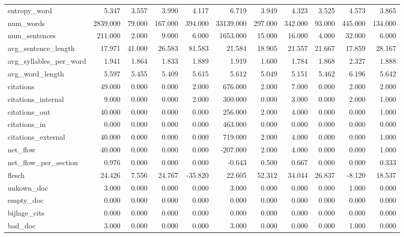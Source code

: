 \begin{tabular}{lrrrrrrrrrr}
\cline{1-11}
entropy\_word & 5.347 & 3.557 & 3.990 & 4.117 & 6.719 & 3.949 & 4.323 & 3.525 & 4.573 & 3.865 \\
\cline{1-11}
num\_words & 2839.000 & 79.000 & 167.000 & 394.000 & 33139.000 & 297.000 & 342.000 & 93.000 & 445.000 & 134.000 \\
\cline{1-11}
num\_sentences & 211.000 & 2.000 & 9.000 & 6.000 & 1653.000 & 15.000 & 16.000 & 4.000 & 32.000 & 6.000 \\
\cline{1-11}
avg\_sentence\_length & 17.971 & 41.000 & 26.583 & 81.583 & 21.584 & 18.905 & 21.557 & 21.667 & 17.859 & 28.167 \\
\cline{1-11}
avg\_syllables\_per\_word & 1.941 & 1.864 & 1.833 & 1.889 & 1.919 & 1.600 & 1.784 & 1.868 & 2.327 & 1.888 \\
\cline{1-11}
avg\_word\_length & 5.597 & 5.455 & 5.409 & 5.615 & 5.612 & 5.049 & 5.151 & 5.462 & 6.196 & 5.642 \\
\cline{1-11}
citations & 49.000 & 0.000 & 0.000 & 2.000 & 676.000 & 2.000 & 7.000 & 0.000 & 2.000 & 2.000 \\
\cline{1-11}
citations\_internal & 9.000 & 0.000 & 0.000 & 2.000 & 300.000 & 0.000 & 3.000 & 0.000 & 2.000 & 1.000 \\
\cline{1-11}
citations\_out & 40.000 & 0.000 & 0.000 & 0.000 & 256.000 & 2.000 & 4.000 & 0.000 & 0.000 & 1.000 \\
\cline{1-11}
citations\_in & 0.000 & 0.000 & 0.000 & 0.000 & 463.000 & 0.000 & 0.000 & 0.000 & 0.000 & 0.000 \\
\cline{1-11}
citations\_external & 40.000 & 0.000 & 0.000 & 0.000 & 719.000 & 2.000 & 4.000 & 0.000 & 0.000 & 1.000 \\
\cline{1-11}
net\_flow & 40.000 & 0.000 & 0.000 & 0.000 & -207.000 & 2.000 & 4.000 & 0.000 & 0.000 & 1.000 \\
\cline{1-11}
net\_flow\_per\_section & 0.976 & 0.000 & 0.000 & 0.000 & -0.643 & 0.500 & 0.667 & 0.000 & 0.000 & 0.333 \\
\cline{1-11}
flesch & 24.426 & 7.556 & 24.767 & -35.820 & 22.605 & 52.312 & 34.044 & 26.837 & -8.120 & 18.537 \\
\cline{1-11}
unkown\_doc & 3.000 & 0.000 & 0.000 & 0.000 & 3.000 & 0.000 & 0.000 & 0.000 & 1.000 & 0.000 \\
\cline{1-11}
empty\_doc & 0.000 & 0.000 & 0.000 & 0.000 & 0.000 & 0.000 & 0.000 & 0.000 & 0.000 & 0.000 \\
\cline{1-11}
bijlage\_cits & 0.000 & 0.000 & 0.000 & 0.000 & 0.000 & 0.000 & 0.000 & 0.000 & 0.000 & 0.000 \\
\cline{1-11}
bad\_doc & 3.000 & 0.000 & 0.000 & 0.000 & 3.000 & 0.000 & 0.000 & 0.000 & 1.000 & 0.000 \\
\cline{1-11}
\bottomrule
\end{tabular}
